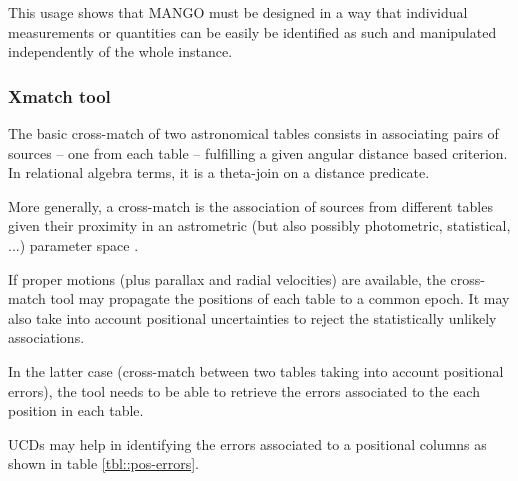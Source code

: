 \documentclass[11pt,a4paper]{ivoa}
\begin{document}
This usage shows that MANGO must be designed in a way that individual measurements or quantities can be easily be identified as such and manipulated independently of the whole instance.


\subsubsection{Xmatch tool }

The basic cross-match of two astronomical tables consists in associating pairs of sources -- one from each table -- fulfilling a given angular distance based criterion.
In relational algebra terms, it is a theta-join on a distance predicate.

More generally, a cross-match is the association of sources from different tables given their proximity in an astrometric (but also possibly photometric, statistical, ...) parameter space \citep{2017A&A...597A..89P} .

If proper motions (plus parallax and radial velocities) are available, the cross-match tool may propagate the positions of each table to a common epoch.
It may also take into account positional uncertainties to reject the statistically unlikely associations.

In the latter case (cross-match between two tables taking into account positional errors), the tool needs to be able to retrieve the errors associated to the each position in each table.

UCDs may help in identifying the errors associated to a positional columns as shown in table \ref{tbl::pos-errors}.
\end{document}
